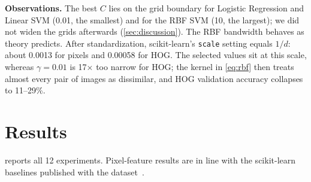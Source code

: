 \documentclass[conference]{IEEEtran}
\begin{document}
\textbf{Observations.} The best $C$ lies on the grid boundary for Logistic Regression and Linear SVM (0.01, the smallest)
and for the RBF SVM (10, the largest); we did not widen the grids afterwards (\cref{sec:discussion}). The RBF bandwidth
behaves as theory predicts. After standardization, scikit-learn's \texttt{scale} setting equals $1/d$: about 0.0013 for
pixels and 0.00058 for HOG. The selected values sit at this scale, whereas $\gamma=0.01$ is 17$\times$ too narrow for
HOG; the kernel in \eqref{eq:rbf} then treats almost every pair of images as dissimilar, and HOG validation accuracy
collapses to 11--29\%.

\section{Results}
\label{sec:results}
 reports all 12 experiments. Pixel-feature results are in line with the scikit-learn baselines
published with the dataset~\cite{xiao2017fashion}.
\end{document}
